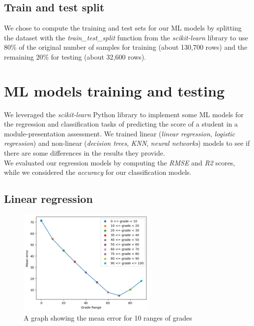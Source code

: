 \documentclass{article}
\begin{document}
\subsection{Train and test split}

We chose to compute the training and test sets for our ML models by splitting the dataset with the \textit{train\_test\_split} function from the \textit{scikit-learn} library to use 80\% of the original number of samples for training (about 130,700 rows) and the remaining 20\% for testing (about 32,600 rows).

\section{ML models training and testing}
We leveraged the \textit{scikit-learn} Python library to implement some ML models for the regression and classification tasks of predicting the score of a student in a module-presentation assessment. We trained linear (\textit{linear regression}, \textit{logistic regression}) and non-linear (\textit{decision trees}, \textit{KNN}, \textit{neural networks}) models to see if there are some differences in the results they provide.\\

We evaluated our regression models by computing the \textit{RMSE} and \textit{R2} scores, while we considered the \textit{accuracy} for our classification models.

\subsection{Linear regression}

\begin{figure}[h]
    \centering
    \includegraphics[width=0.6\textwidth]{grades_errors.png}
    \caption{A graph showing the mean error for 10 ranges of grades}
    \label{fig:errorGraph}
\end{figure}
\end{document}
